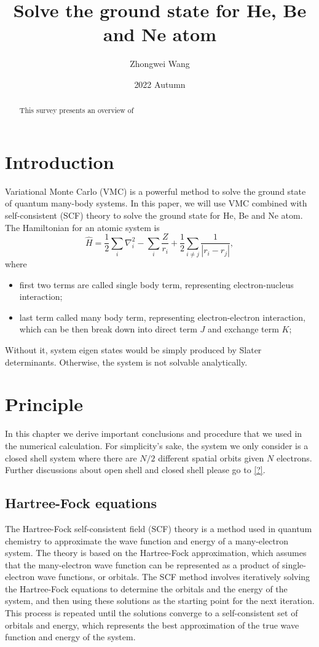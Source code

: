 \documentclass[11pt]{article}
\title{Solve the ground state for He, Be and Ne atom}
\author{Zhongwei Wang}
\date{2022 Autumn}
\begin{document}
\maketitle

\begin{abstract}
This survey presents an overview of 
\end{abstract}

\section{Introduction}\label{section-introduction}
Variational Monte Carlo (VMC) is a powerful method to solve the ground state of quantum many-body systems.  
In this paper, we will use VMC combined with self-consistent (SCF) theory to solve the ground state for He, Be and Ne atom. The Hamiltonian for an atomic system is
\begin{equation}\label{eq:hamiltonian}
\hat{H} = \frac{1}{2}\sum_{i}\nabla_i^2  - \sum_i \frac{Z}{r_i} + \frac{1}{2}\sum_{i \neq j} \frac{1}{|r_i-r_j|},
\end{equation}
where
\begin{itemize}
    \item first two terms are called single body term, representing electron-nucleus interaction;
    \item last term called many body term, representing electron-electron interaction, which can be then break down into 
    direct term $J$ and exchange term $K$; 
\end{itemize}
Without it, system eigen states would be simply produced by Slater determinants. 
Otherwise, the system is not solvable analytically.


\section{Principle}
In this chapter we derive important conclusions and procedure that we used in the numerical calculation. 
For simplicity's sake, the system we only consider is a closed shell system where there are $N/2$ different spatial orbits given $N$ electrons.
Further discussions about open shell and closed shell please go to \ref{?}.

\subsection{Hartree-Fock equations}
The Hartree-Fock self-consistent field (SCF) theory is a method used in quantum chemistry to approximate the wave function and energy of a many-electron system. 
The theory is based on the Hartree-Fock approximation, which assumes that the many-electron wave function can be represented as a product of single-electron wave functions, or orbitals. 
The SCF method involves iteratively solving the Hartree-Fock equations to determine the orbitals and the energy of the system, and then using these solutions as the starting point for the next iteration. 
This process is repeated until the solutions converge to a self-consistent set of orbitals and energy, which represents the best approximation of the true wave function and energy of the system.
\end{document}
